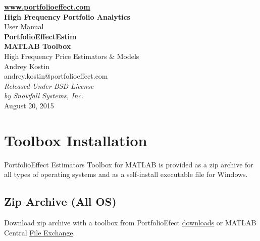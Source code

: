 \documentclass[letterpaper]{report}
\begin{document}
\begin{titlepage}
\begin{center}
\vspace{5cm}
{\bfseries\href{https://www.portfolioeffect.com}{www.portfolioeffect.com} \\
High Frequency Portfolio Analytics\\}
\vspace{8cm}
{\huge User Manual \\}
\vspace{0.3cm}
{\Huge\bfseries PortfolioEffectEstim \\ MATLAB Toolbox \\}
\vspace{0.4cm}
{\Large High Frequency Price Estimators \& Models \\}
\vspace{1.5cm}
{Andrey Kostin \\ andrey.kostin@portfolioeffect.com} \\[14pt]
\vfill
\emph{{Released Under BSD License\\ by Snowfall Systems,
Inc.}}\\[2cm]
{August 20, 2015}
\end{center}
\end{titlepage}

\cleardoublepage
{}
{}
\renewcommand{\bibname}{Contents}
\tableofcontents 

\chapter{Toolbox Installation}
PortfolioEffect Estimators Toolbox for MATLAB is provided as a zip archive for
all types of operating systems and as a self-install executable file for Windows. 

\section{Zip Archive (All OS)}
Download zip archive with a toolbox from
PortfolioEfect
\href{https://www.portfolioeffect.com/docs/platform/quant/downloads}{downloads}
or MATLAB Central
\href{http://www.mathworks.com/matlabcentral/fileexchange}{File Exchange}.
\end{document}
